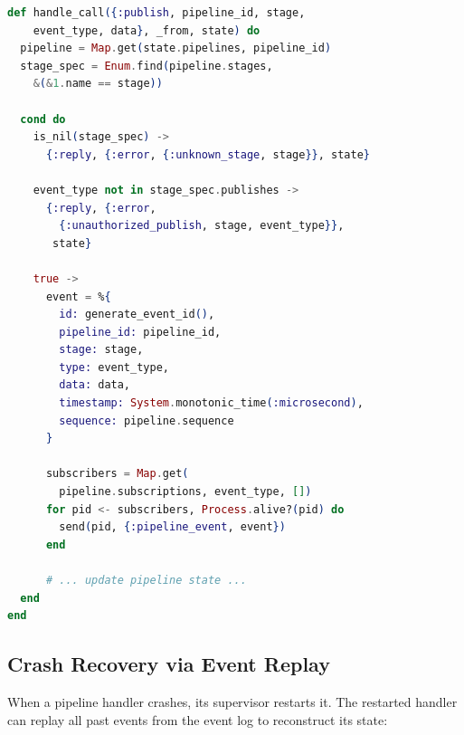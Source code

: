 \documentclass[12pt,a4paper]{article}
\theoremstyle{definition}
\theoremstyle{remark}
\begin{document}
\begin{lstlisting}[language=elixir, caption={Event publishing with authorization check (from \texttt{pipeline.ex})}, label={lst:publish}]
def handle_call({:publish, pipeline_id, stage,
    event_type, data}, _from, state) do
  pipeline = Map.get(state.pipelines, pipeline_id)
  stage_spec = Enum.find(pipeline.stages,
    &(&1.name == stage))

  cond do
    is_nil(stage_spec) ->
      {:reply, {:error, {:unknown_stage, stage}}, state}

    event_type not in stage_spec.publishes ->
      {:reply, {:error,
        {:unauthorized_publish, stage, event_type}},
       state}

    true ->
      event = %{
        id: generate_event_id(),
        pipeline_id: pipeline_id,
        stage: stage,
        type: event_type,
        data: data,
        timestamp: System.monotonic_time(:microsecond),
        sequence: pipeline.sequence
      }

      subscribers = Map.get(
        pipeline.subscriptions, event_type, [])
      for pid <- subscribers, Process.alive?(pid) do
        send(pid, {:pipeline_event, event})
      end

      # ... update pipeline state ...
  end
end
\end{lstlisting}

\subsection{Crash Recovery via Event Replay}

When a pipeline handler crashes, its supervisor restarts it. The restarted handler can replay all past events from the event log to reconstruct its state:
\end{document}
